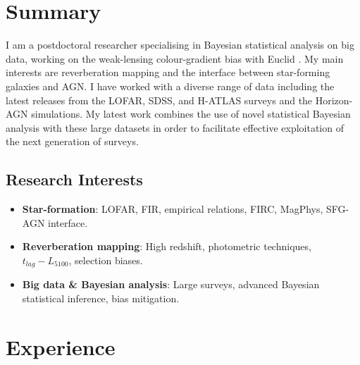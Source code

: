 \documentclass[letterpaper]{twentysecondcv} %
\begin{document}
\makeprofile %
 

\section{Summary}
     I am a postdoctoral researcher specialising in Bayesian statistical analysis on big data, working on the weak-lensing colour-gradient bias with Euclid .
My main interests are reverberation mapping and the interface between star-forming galaxies and AGN. 
I have worked with a diverse range of data including the latest releases from the LOFAR, SDSS, and H-ATLAS surveys and the Horizon-AGN simulations. 
My latest work combines the use of novel statistical Bayesian analysis with these large datasets in order to facilitate effective exploitation of the 
next generation of surveys.


\subsection{Research Interests}
\begin{itemize}
     \item \textbf{Star-formation}: LOFAR, FIR, empirical relations, FIRC, MagPhys, SFG-AGN interface.
 \item \textbf{Reverberation mapping}: High redshift, photometric techniques, $t_{lag}-L_{5100}$, selection
biases.
 \item \textbf{Big data \& Bayesian analysis}: Large surveys, advanced Bayesian statistical inference, bias mitigation.
\end{itemize}

\section{Experience}
\end{document}
